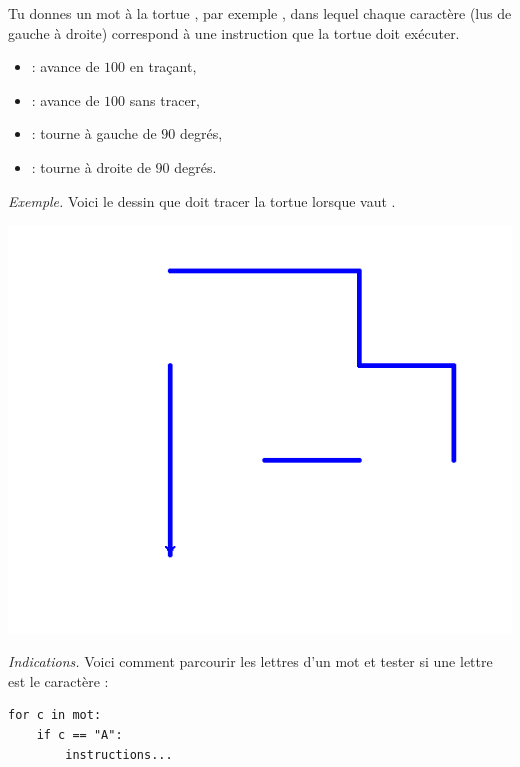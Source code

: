 \documentclass[11pt,class=report,crop=false]{standalone}
\begin{document}
\begin{activite}


Tu donnes un mot à la tortue \Python, par exemple , dans lequel chaque caractère (lus de gauche à droite) correspond à une instruction que la tortue doit exécuter.

\begin{itemize}
  \item {} : avance de $100$ en traçant,
  \item {} : avance de $100$ sans tracer,  
  \item {} : tourne à gauche de $90$ degrés,
  \item {} : tourne à droite de $90$ degrés.
\end{itemize}

\emph{Exemple.}
Voici le dessin que doit tracer la tortue lorsque  vaut . 

\begin{center}
\includegraphics[scale=0.4]{ecran-sialors-2}
\end{center}

\emph{Indications.}
Voici comment parcourir les lettres d'un mot et tester si une lettre est le caractère  :
\begin{center}
\begin{minipage}{0.5\textwidth}
\begin{lstlisting}
for c in mot:
    if c == "A":
        instructions...
\end{lstlisting}
\end{minipage} 
\end{center} 

   
\end{activite}
\end{document}
